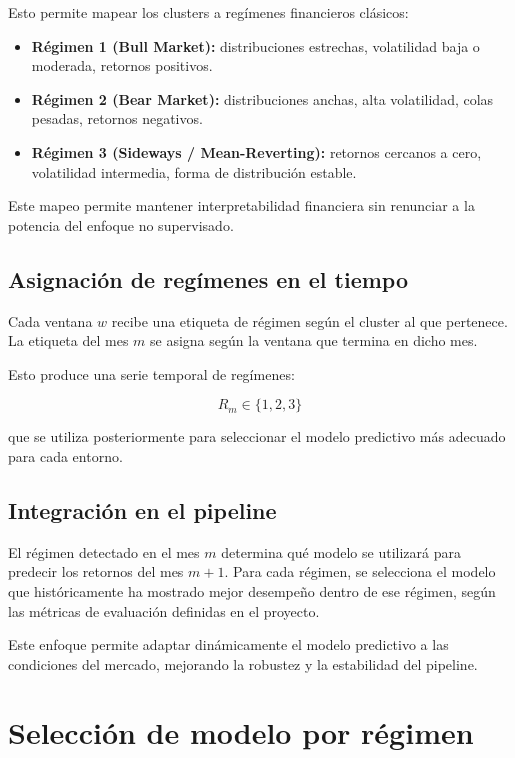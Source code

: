 \documentclass[12pt]{article}
\begin{document}
Esto permite mapear los clusters a regímenes financieros clásicos:

\begin{itemize}
    \item \textbf{Régimen 1 (Bull Market):} distribuciones estrechas, volatilidad baja o moderada, retornos positivos.
    \item \textbf{Régimen 2 (Bear Market):} distribuciones anchas, alta volatilidad, colas pesadas, retornos negativos.
    \item \textbf{Régimen 3 (Sideways / Mean-Reverting):} retornos cercanos a cero, volatilidad intermedia, forma de distribución estable.
\end{itemize}

Este mapeo permite mantener interpretabilidad financiera sin renunciar a la potencia del enfoque no supervisado.

\subsection{Asignación de regímenes en el tiempo}

Cada ventana $w$ recibe una etiqueta de régimen según el cluster al que pertenece.  
La etiqueta del mes $m$ se asigna según la ventana que termina en dicho mes.

Esto produce una serie temporal de regímenes:



\[
R_m \in \{1, 2, 3\}
\]



que se utiliza posteriormente para seleccionar el modelo predictivo más adecuado para cada entorno.

\subsection{Integración en el pipeline}

El régimen detectado en el mes $m$ determina qué modelo se utilizará para predecir los retornos del mes $m+1$. Para cada régimen, se selecciona el modelo que históricamente ha mostrado mejor desempeño dentro de ese régimen, según las métricas de evaluación definidas en el proyecto.

Este enfoque permite adaptar dinámicamente el modelo predictivo a las condiciones del mercado, mejorando la robustez y la estabilidad del pipeline.

\section{Selección de modelo por régimen}
\end{document}
